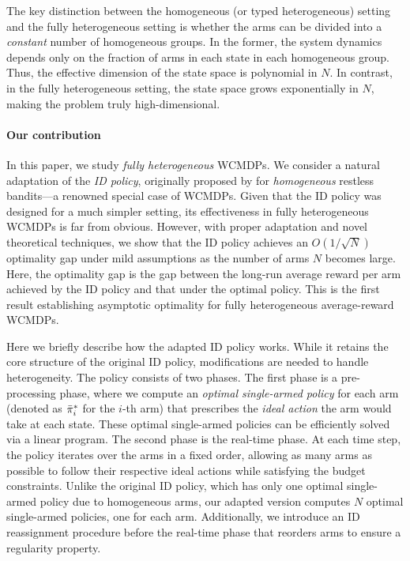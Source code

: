 \documentclass[11pt,letterpaper]{article}
\begin{document}
The key distinction between the homogeneous (or typed heterogeneous) setting and the fully heterogeneous setting is whether the arms can be divided into a \emph{constant} number of homogeneous groups.
In the former, the system dynamics depends only on the fraction of arms in each state in each homogeneous group.
Thus, the effective dimension of the state space is polynomial in $N$.
In contrast, in the fully heterogeneous setting, the state space grows exponentially in $N$, making the problem truly high-dimensional.


\paragraph{Our contribution}
In this paper, we study \emph{fully heterogeneous} WCMDPs.
We consider a natural adaptation of the \emph{ID policy}, originally proposed by \citet{HonXieChe_24} for \emph{homogeneous} restless bandits---a renowned special case of WCMDPs.
Given that the ID policy was designed for a much simpler setting, its effectiveness in fully heterogeneous WCMDPs is far from obvious.
However, with proper adaptation and novel theoretical techniques, we show that the ID policy achieves an $O(1/\sqrt{N})$ optimality gap under mild assumptions as the number of arms $N$ becomes large.
Here, the optimality gap is the gap between the long-run average reward per arm achieved by the ID policy and that under the optimal policy.
This is the first result establishing asymptotic optimality for fully heterogeneous average-reward WCMDPs.


Here we briefly describe how the adapted ID policy works.
While it retains the core structure of the original ID policy, modifications are needed to handle heterogeneity.
The policy consists of two phases.
The first phase is a pre-processing phase, where we compute an \emph{optimal single-armed policy} for each arm (denoted as ${{\bar{\pi}}^*}_i$ for the $i$-th arm) that prescribes the \emph{ideal action} the arm would take at each state.
These optimal single-armed policies can be efficiently solved via a linear program. 
The second phase is the real-time phase.
At each time step, the policy iterates over the arms in a fixed order, allowing as many arms as possible to follow their respective ideal actions while satisfying the budget constraints. 
Unlike the original ID policy, which has only one optimal single-armed policy due to homogeneous arms, our adapted version computes $N$ optimal single-armed policies, one for each arm.  
Additionally, we introduce an ID reassignment procedure before the real-time phase that reorders arms to ensure a regularity property. 
\end{document}
